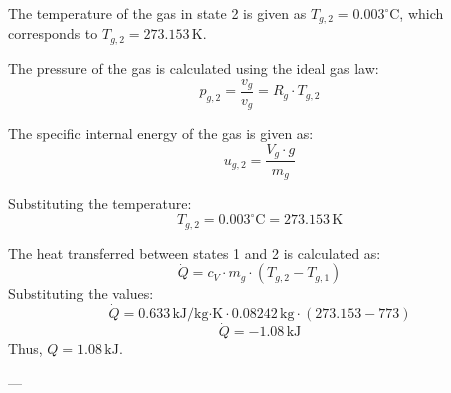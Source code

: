 The temperature of the gas in state 2 is given as \( T_{g,2} = 0.003^\circ\text{C} \), which corresponds to \( T_{g,2} = 273.153 \, \text{K} \).  

The pressure of the gas is calculated using the ideal gas law:  
\[
p_{g,2} = \frac{v_{g}}{v_{g}} = R_g \cdot T_{g,2}
\]  

The specific internal energy of the gas is given as:  
\[
u_{g,2} = \frac{V_{g} \cdot g}{m_g}
\]  

Substituting the temperature:  
\[
T_{g,2} = 0.003^\circ\text{C} = 273.153 \, \text{K}
\]  

The heat transferred between states 1 and 2 is calculated as:  
\[
\dot{Q} = c_V \cdot m_g \cdot (T_{g,2} - T_{g,1})
\]  
Substituting the values:  
\[
\dot{Q} = 0.633 \, \text{kJ/kg·K} \cdot 0.08242 \, \text{kg} \cdot (273.153 - 773)
\]  
\[
\dot{Q} = -1.08 \, \text{kJ}
\]  
Thus, \( Q = 1.08 \, \text{kJ} \).  

---